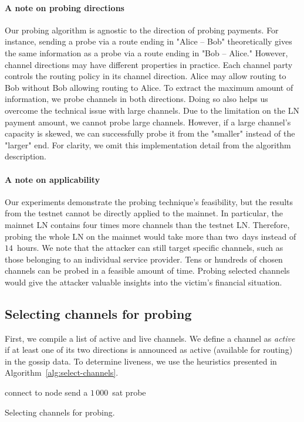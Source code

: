 \paragraph{A note on probing directions}
Our probing algorithm is agnostic to the direction of probing payments.
For instance, sending a probe via a route ending in "Alice -- Bob" theoretically gives the same information as a probe via a route ending in "Bob -- Alice."
However, channel directions may have different properties in practice.
Each channel party controls the routing policy in its channel direction.
Alice may allow routing to Bob without Bob allowing routing to Alice.
To extract the maximum amount of information, we probe channels in both directions.
Doing so also helps us overcome the technical issue with large channels.
Due to the limitation on the LN payment amount, we cannot probe large channels.
However, if a large channel's capacity is skewed, we can successfully probe it from the "smaller" instead of the "larger" end.
For clarity, we omit this implementation detail from the algorithm description.

\paragraph{A note on applicability}
Our experiments demonstrate the probing technique's feasibility, but the results from the testnet cannot be directly applied to the mainnet.
In particular, the mainnet LN contains four times more channels than the testnet LN\@.
Therefore, probing the whole LN on the mainnet would take more than two~days instead of~$14$~hours.
We note that the attacker can still target specific channels, such as those belonging to an individual service provider.
Tens or hundreds of chosen channels can be probed in a feasible amount of time.
Probing selected channels would give the attacker valuable insights into the victim's financial situation.


\subsection{Selecting channels for probing}

First, we compile a list of active and live channels.
We define a channel as \textit{active} if at least one of its two directions is announced as active (available for routing) in the gossip data.
To determine liveness, we use the heuristics presented in Algorithm~\ref{alg:select-channels}.

\begin{algorithm}
	 {
		connect to node\;
	}
	 {
		send a $1\,000$~sat probe\;
	}
	\caption{Selecting channels for probing.}
	\label{alg:select-channels}
\end{algorithm}

